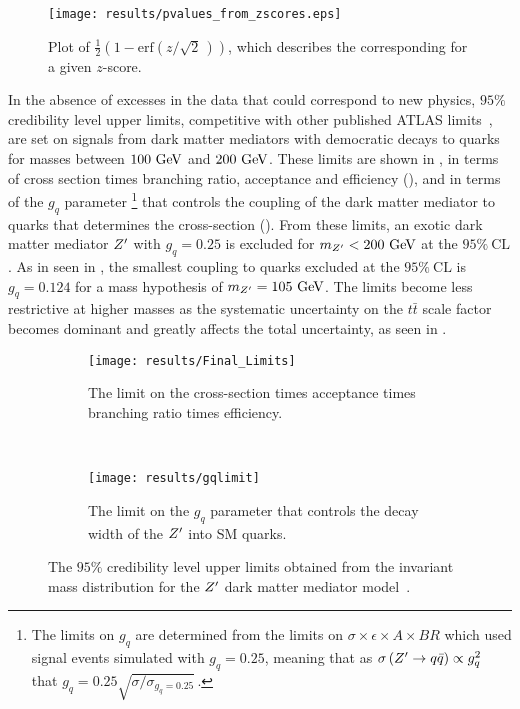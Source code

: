 \begin{figure}[htbp]
 \centering
 \texttt{[image: results/pvalues\_from\_zscores.eps]}
 \caption[Plot of \pvalue{} as a function of $z$-score.]{%
  Plot of $\frac{1}{2}\left(1 - \mathrm{erf}\left(z/\sqrt{2}\,\right)\right)$, which describes the corresponding \pvalue{} for a given $z$-score.}\label{fig:pvalues_from_zscores}
\end{figure}

In the absence of excesses in the data that could correspond to new physics, $95\%$ credibility level upper limits, competitive with other published ATLAS limits~\cite{Zprime_gq_limit_public_plot}, are set on signals from dark matter mediators with democratic decays to quarks for masses between $100~\mathrm{GeV}$ and $200~\mathrm{GeV}$.
These limits are shown in , in terms of cross section times branching ratio, acceptance and efficiency (), and in terms of the $g_{q}$ parameter%
\footnote{The limits on $g_{q}$ are determined from the limits on $\sigma \times \epsilon \times A \times BR$ which used signal events simulated with $g_{q} = 0.25$, meaning that as $\sigma\left(Z' \to q\bar{q}\right) \propto g_{q}^{2}$ that $g_{q} = 0.25 \sqrt{\sigma/\sigma_{g_{q} = 0.25}}$\,.}
that controls the coupling of the \gls{dark matter mediator} to quarks that determines the cross-section ().
From these limits, an exotic dark matter mediator $\Zprime$ with $g_{q}=0.25$ is excluded for $m_{Z'} < 200~\mathrm{GeV}$ at the $95\%~\mathrm{CL}$.
As in seen in , the smallest coupling to quarks excluded at the $95\%~\mathrm{CL}$ is $g_{q} = 0.124$ for a mass hypothesis of $m_{Z'} = 105~\mathrm{GeV}$.
The limits become less restrictive at higher masses as the systematic uncertainty on the $t\bar{t}$ scale factor becomes dominant and greatly affects the total uncertainty, as seen in .

\begin{figure}[htbp]
 \centering
 \begin{subfigure}[t]{0.5\textwidth}
  \centering
  \texttt{[image: results/Final\_Limits]}
  \caption{The limit on the cross-section times acceptance times branching ratio times efficiency.}
  \label{fig:cross_section_limits}
 \end{subfigure}%
 ~
 \begin{subfigure}[t]{0.5\textwidth}
  \centering
  \texttt{[image: results/gqlimit]}
  \caption{The limit on the $g_{q}$ parameter that controls the decay width of the $\Zprime$ into SM quarks.}
  \label{fig:gq_limits}
 \end{subfigure}
 \caption[The $95\%$ credibility level upper limits obtained from the invariant mass distribution for the $\Zprime$ dark matter mediator model.]{%
  The $95\%$ credibility level upper limits obtained from the invariant mass distribution for the $\Zprime$ dark matter mediator model~\cite{ATLAS-CONF-2018-052}.}
 \label{fig:Zprime_limits}
\end{figure}

